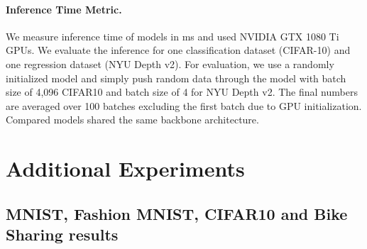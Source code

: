 \paragraph{Inference Time Metric.} We measure inference time of models in ms and used NVIDIA GTX 1080 Ti GPUs. We evaluate the inference for one classification dataset (CIFAR-10) and one regression dataset (NYU Depth v2). For evaluation, we use a randomly initialized model and simply push random data through the model with batch size of 4,096 CIFAR10 and batch size of 4 for NYU Depth v2. The final numbers are averaged over 100 batches excluding the first batch due to GPU initialization. Compared models shared the same backbone architecture.

\section{Additional Experiments}

\subsection{MNIST, Fashion MNIST, CIFAR10 and Bike Sharing results}

